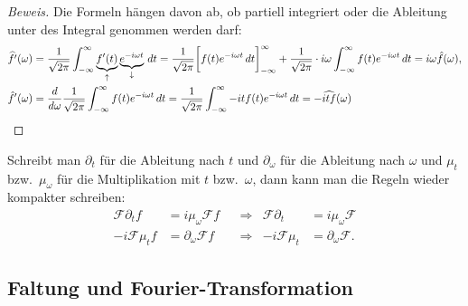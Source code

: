 \begin{proof}[Beweis]
Die Formeln hängen davon ab, ob partiell integriert oder die Ableitung
unter des Integral genommen werden darf:
\begin{align*}
\widehat{f'}(\omega)
&=
\frac{1}{\sqrt{2\pi}}
\int_{-\infty}^\infty \underbrace{f'(t)}_{\uparrow}\underbrace{e^{-i\omega t}}_{\downarrow}\,dt
=
\frac{1}{\sqrt{2\pi}}
\biggl[
f(t)e^{-i\omega t}\,dt
\biggr]_{-\infty}^\infty
+
\frac{1}{\sqrt{2\pi}}
\cdot
i\omega
\int_{-\infty}^\infty f(t)e^{-i\omega t}\,dt
=
i\omega\hat{f}(\omega),
\\
\hat{f}'(\omega)
&=
\frac{d}{d\omega}
\frac{1}{\sqrt{2\pi}} \int_{-\infty}^\infty
f(t) e^{-i\omega t}\,dt
=
\frac{1}{\sqrt{2\pi}} \int_{-\infty}^\infty
-it f(t) e^{-i\omega t}\,dt
=
-\widehat{itf}(\omega)
\qedhere
\end{align*}
\end{proof}

Schreibt man $\partial_t$ für die Ableitung nach $t$ und $\partial_\omega$
für die Ableitung nach $\omega$ und $\mu_{t}$ bzw.~$\mu_{\omega}$ für
die Multiplikation mit $t$ bzw.~$\omega$, dann kann man die Regeln wieder
kompakter schreiben:
\[
\begin{aligned}
\mathcal{F}\partial_t f &= i\mu_{\omega}\mathcal{F}f
&&\Rightarrow&
\mathcal{F}\partial_t &= i\mu_{\omega}\mathcal{F}
\\
-i\mathcal{F}\mu_t f &= \partial_\omega\mathcal{F} f
&&\Rightarrow&
-i\mathcal{F}\mu_t &= \partial_\omega\mathcal{F}.
\end{aligned}
\]

\subsection{Faltung und Fourier-Transformation
\label{subsection:faltung-und-ft}}

